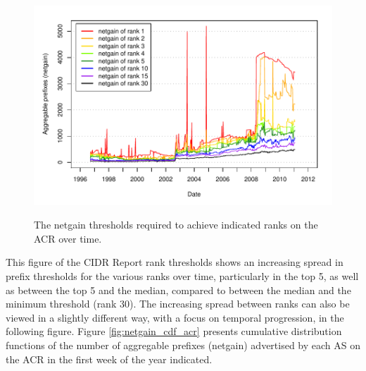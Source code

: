 \begin{figure}[h!]
\begin{centering}
\begin{singlespace}
    \includegraphics[width=6in]{figures/acr_netgain_time.pdf}
    \vspace{-2em}\\
    \caption{The netgain thresholds required to achieve indicated ranks on the
    ACR over time.}
    \label{fig:thresholds}
    \end{singlespace}
\end{centering}
\end{figure}


This figure of the CIDR Report rank thresholds shows an increasing spread in
prefix thresholds for the various ranks over time, particularly in the top 5,
as well as between the top 5 and the median, compared to between the median and
the minimum threshold (rank 30). The increasing spread between ranks can also
be viewed in a slightly different way, with a focus on temporal progression, in
the following figure. Figure \ref{fig:netgain_cdf_acr} presents cumulative
distribution functions of the number of aggregable prefixes (netgain)
advertised by each AS on the ACR in the first week of the year indicated.

